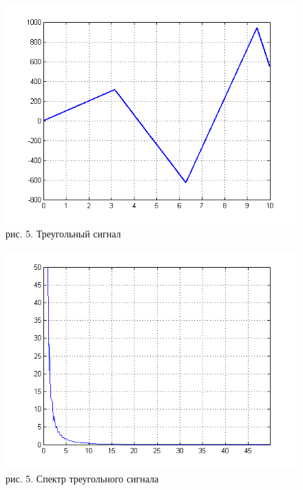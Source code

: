 \documentclass[10pt,a4paper]{report}
\begin{document}
\begin{figure}
\begin{center}
\includegraphics[angle=0, scale = 0.9]{5_5.png}\newline
рис. 5. Треугольный сигнал\newline
\end{center}
\end{figure}
\begin{figure}
\begin{center}
\includegraphics[angle=0, scale = 0.9]{5_6.png}\newline
рис. 5. Спектр треугольного сигнала\newline
\end{center}
\end{figure}
\end{document}
